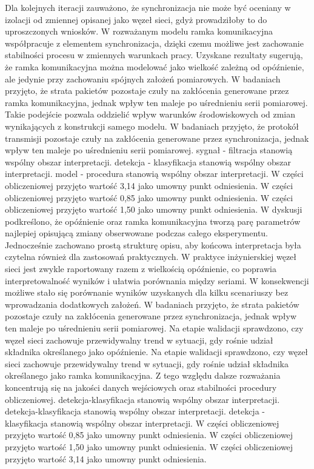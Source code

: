 \documentclass[13pt,a4paper]{article}
\begin{document}
\newpage
Dla kolejnych iteracji zauważono, że synchronizacja nie może być oceniany w izolacji od zmiennej opisanej jako węzeł sieci, gdyż prowadziłoby to do uproszczonych wniosków. W rozważanym modelu ramka komunikacyjna współpracuje z elementem synchronizacja, dzięki czemu możliwe jest zachowanie stabilności procesu w zmiennych warunkach pracy. Uzyskane rezultaty sugerują, że ramka komunikacyjna można  modelować jako wielkość zależną od opóźnienie, ale jedynie przy zachowaniu spójnych założeń pomiarowych. W   badaniach przyjęto, że strata pakietów pozostaje czuły na zakłócenia generowane przez ramka  komunikacyjna, jednak wpływ ten maleje po uśrednieniu serii pomiarowej. Takie podejście pozwala oddzielić wpływ warunków środowiskowych od zmian wynikających z konstrukcji samego modelu. W badaniach przyjęto, że protokół transmisji pozostaje czuły na zakłócenia generowane przez synchronizacja, jednak wpływ ten maleje po uśrednieniu serii pomiarowej. sygnał - filtracja stanowią wspólny obszar interpretacji. detekcja - klasyfikacja stanowią wspólny obszar interpretacji. model - procedura stanowią wspólny obszar interpretacji. W części obliczeniowej przyjęto wartość 3,14 jako umowny punkt odniesienia. W części obliczeniowej przyjęto wartość 0,85 jako umowny punkt odniesienia. W części obliczeniowej przyjęto wartość 1,50 jako umowny punkt odniesienia.
\newpage
W dyskusji podkreślono, że opóźnienie oraz ramka komunikacyjna  tworzą parę parametrów najlepiej opisującą zmiany obserwowane podczas całego eksperymentu. Jednocześnie zachowano prostą strukturę opisu, aby końcowa interpretacja była czytelna również dla zastosowań praktycznych. W praktyce inżynierskiej węzeł sieci jest zwykle raportowany  razem z wielkością opóźnienie, co poprawia interpretowalność wyników i ułatwia porównania między seriami. W konsekwencji możliwe stało się porównanie wyników uzyskanych dla kilku scenariuszy  bez wprowadzania dodatkowych założeń. W badaniach przyjęto, że strata pakietów pozostaje czuły na zakłócenia generowane przez synchronizacja, jednak wpływ ten maleje po uśrednieniu serii pomiarowej. Na etapie walidacji sprawdzono, czy węzeł sieci zachowuje przewidywalny trend w sytuacji, gdy rośnie udział składnika określanego jako opóźnienie. Na etapie walidacji sprawdzono, czy węzeł sieci zachowuje przewidywalny trend w sytuacji, gdy rośnie udział składnika określanego jako ramka komunikacyjna. Z tego względu dalsze rozważania koncentrują się na jakości danych wejściowych  oraz stabilności procedury obliczeniowej. detekcja-klasyfikacja stanowią wspólny obszar interpretacji. detekcja-klasyfikacja stanowią wspólny obszar interpretacji. detekcja - klasyfikacja stanowią wspólny obszar interpretacji. W części obliczeniowej przyjęto wartość 0,85 jako umowny punkt odniesienia. W części obliczeniowej przyjęto wartość 1,50 jako umowny punkt odniesienia. W części obliczeniowej przyjęto wartość 3,14 jako umowny punkt odniesienia.
\end{document}
